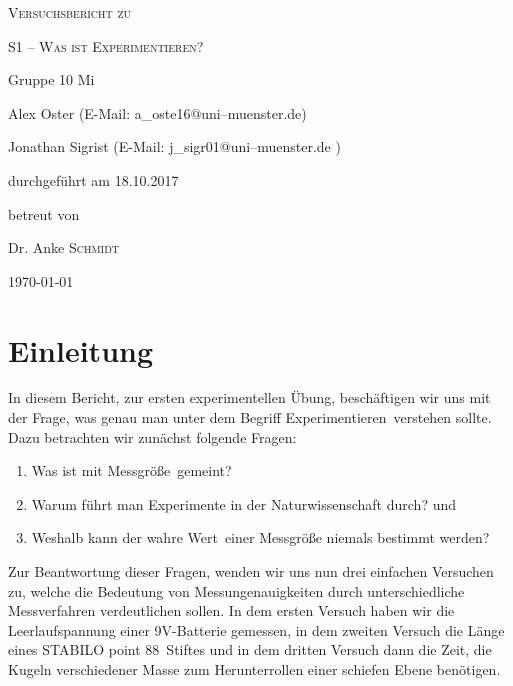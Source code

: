 \documentclass[11pt,a4paper,titlepage, ngerman]{article}
\begin{document}
	\setlength{\parindent}{0em} 
	
	\begin{titlepage}
		\centering
		{\scshape\LARGE Versuchsbericht zu \par}
		\vspace{1cm}
		{\scshape\huge S1 -- Was ist Experimentieren?\par}
		\vspace{2.5cm}
		{\LARGE Gruppe 10 Mi\par}
		\vspace{0.5cm}
		{\large Alex Oster (E-Mail: a\_oste16@uni--muenster.de) \par}
		{\large Jonathan Sigrist (E-Mail: j\_sigr01@uni--muenster.de ) \par}
		\vfill
		durchgeführt am 18.10.2017\par
		betreut von\par
		{\large Dr. Anke \textsc{Schmidt}}
		
		\vfill
		
		{\large \today\par}
	\end{titlepage}
		
	\tableofcontents
	
	\newpage
	
	\section{Einleitung}
		\label{Einleitung}
		
		In diesem Bericht, zur ersten experimentellen Übung, beschäftigen wir uns mit der Frage, was genau man unter dem Begriff \glqq Experimentieren\grqq\ verstehen sollte. Dazu betrachten wir zunächst folgende Fragen:
	
		\begin{enumerate}
			
			\item Was ist mit \glqq Messgröße\grqq\ gemeint?
			\item Warum führt man Experimente in der Naturwissenschaft durch? und
			\item Weshalb kann der \glqq wahre Wert\grqq\ einer Messgröße niemals bestimmt werden?
			
		\end{enumerate}
			
			Zur Beantwortung dieser Fragen, wenden wir uns nun drei einfachen Versuchen zu, welche die Bedeutung von Messungenauigkeiten durch unterschiedliche Messverfahren verdeutlichen sollen. In dem ersten Versuch haben wir die Leerlaufspannung einer 9V-Batterie gemessen, in dem zweiten Versuch die Länge eines \glqq STABILO point 88\grqq\ Stiftes und in dem dritten Versuch dann die Zeit, die Kugeln verschiedener Masse zum Herunterrollen einer schiefen Ebene benötigen.\\
		
\end{document}
